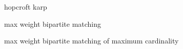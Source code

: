 
\begin{algorithm}{hopcroft karp}
\end{algorithm}

\begin{algorithm}{max weight bipartite matching}
\end{algorithm}

\begin{algorithm}{max weight bipartite matching of maximum cardinality}
\end{algorithm}
